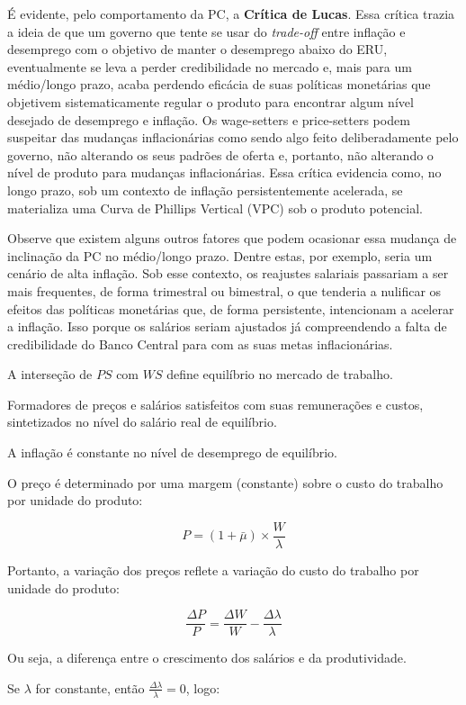 \documentclass[a4paper,12pt]{article}[abntex2]
\begin{document}
É evidente, pelo comportamento da PC, a \textbf{Crítica de Lucas}. Essa crítica trazia a ideia de que um governo que tente se usar do \textit{trade-off} entre inflação e desemprego com o objetivo de manter o desemprego abaixo do ERU, eventualmente se leva a perder credibilidade no mercado e, mais para  um  médio/longo  prazo,  acaba  perdendo  eficácia  de  suas  políticas  monetárias  que objetivem  sistematicamente  regular  o  produto  para  encontrar  algum  nível  desejado  de desemprego  e  inflação.  Os  wage-setters  e  price-setters  podem  suspeitar  das  mudanças inflacionárias como sendo algo feito deliberadamente pelo governo, não alterando os seus padrões de oferta e, portanto, não alterando o nível de produto para mudanças inflacionárias. Essa crítica evidencia como, no longo prazo, sob um contexto de inflação persistentemente acelerada, se materializa uma Curva de Phillips Vertical (VPC) sob o produto potencial. 

Observe que existem alguns outros fatores que podem ocasionar essa mudança de inclinação da PC no médio/longo prazo. Dentre estas, por exemplo, seria um cenário de alta inflação. Sob esse contexto, os reajustes salariais passariam a ser mais frequentes, de forma trimestral ou bimestral,  o  que  tenderia  a  nulificar  os  efeitos  das  políticas  monetárias  que,  de  forma persistente, intencionam a acelerar a inflação. Isso porque os salários seriam ajustados já compreendendo a falta de credibilidade do Banco Central para com as suas metas inflacionárias. 

A interseção de \( PS \) com \( WS \) define equilíbrio no mercado de trabalho.

Formadores de preços e salários satisfeitos com suas remunerações e custos, sintetizados no nível do salário real de equilíbrio.

A inflação é constante no nível de desemprego de equilíbrio.

O preço é determinado por uma margem (constante) sobre o custo do trabalho por unidade do produto:

\[
P = (1 + \bar{\mu}) \times \frac{W}{\lambda}
\]

Portanto, a variação dos preços reflete a variação do custo do trabalho por unidade do produto:

\[
\frac{\Delta P}{P} = \frac{\Delta W}{W} - \frac{\Delta \lambda}{\lambda}
\]

Ou seja, a diferença entre o crescimento dos salários e da produtividade.

Se \(\lambda\) for constante, então \(\frac{\Delta \lambda}{\lambda} = 0\), logo:
\end{document}
